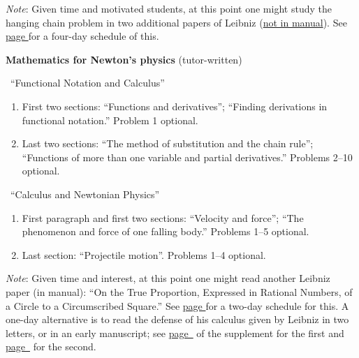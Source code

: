 \documentclass[10pt]{article}
\begin{document}
{\small \emph{Note}: Given
       time and motivated students, at this point one might
       study the hanging
	chain problem in two additional papers of Leibniz
	(\href{https://drive.google.com/file/d/1Q06ypQH26GPMVsxn8SRQVEEn79qmUxOE/view?usp=sharing}{not in manual}).
	See \hyperref[LeibnizHang]{page
		\pageref{LeibnizHang}} for a four-day
	schedule of this.}

	\textbf{Mathematics for Newton's physics}
	(tutor-written)
	

\ ``Functional Notation and
	Calculus''
	

\begin{enumerate}[resume*]
	\item First two sections: ``Functions and
		derivatives''; ``Finding derivations in functional
		notation.'' Problem 1 optional. 
	\item Last two sections: ``The method of
		substitution and the chain rule'';
		``Functions of more than one variable and
		partial derivatives.'' Problems 2--10 optional. 
\end{enumerate}


\ ``Calculus and Newtonian Physics''
\begin{enumerate}[resume*]
	\item First paragraph and first two sections:
		``Velocity and force''; ``The phenomenon and
		force of one falling body.'' Problems 1--5
		optional.
	\item Last section: ``Projectile motion''. Problems
		1--4 optional.
\end{enumerate}
{\small \emph{Note}: Given time and interest, at this point one
might read another Leibniz paper (in manual): 
	``On the True Proportion, Expressed
	in Rational Numbers, of a Circle to a Circumscribed
	Square.'' See \hyperref[LeibnizProp]{page
		\pageref{LeibnizProp}} for a
	two-day schedule for this. A one-day alternative is
	to read the defense of his calculus given by Leibniz
	in two letters, or in an early manuscript; see
	\hyperref[supple.46]{page~\pageref{supple.46}} of
	the
supplement for the first and
\hyperref[supple.51]{page~\pageref{supple.51}} for the
second.}
\end{document}
